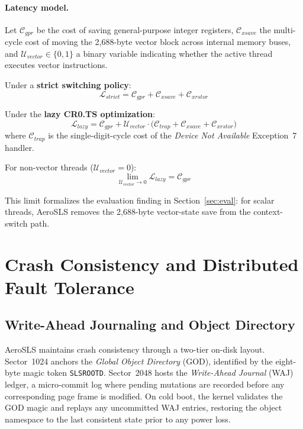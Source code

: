 \documentclass[sigconf]{acmart}
\begin{document}
\paragraph{Latency model.}
Let $\mathcal{C}_{gpr}$ be the cost of saving general-purpose
integer registers, $\mathcal{C}_{xsave}$ the multi-cycle cost of
moving the 2,688-byte vector block across internal memory buses,
and $\mathcal{U}_{vector} \in \{0,1\}$ a binary variable
indicating whether the active thread executes vector
instructions.

Under a \textbf{strict switching policy}:
\begin{equation}
\mathcal{L}_{strict} = \mathcal{C}_{gpr} +
  \mathcal{C}_{xsave} + \mathcal{C}_{xrstor}
\end{equation}

Under the \textbf{lazy CR0.TS optimization}:
\begin{equation}
\mathcal{L}_{lazy} = \mathcal{C}_{gpr} + \mathcal{U}_{vector}
  \cdot \bigl(\mathcal{C}_{trap} + \mathcal{C}_{xsave} +
  \mathcal{C}_{xrstor}\bigr)
\end{equation}
where $\mathcal{C}_{trap}$ is the single-digit-cycle cost of the
\emph{Device Not Available} Exception~7 handler.

For non-vector threads ($\mathcal{U}_{vector} = 0$):
\begin{equation}
\lim_{\mathcal{U}_{vector} \to 0} \mathcal{L}_{lazy}
  = \mathcal{C}_{gpr}
\end{equation}

This limit formalizes the evaluation finding in
Section~\ref{sec:eval}: for scalar threads,
AeroSLS removes the 2,688-byte vector-state save from the
context-switch path.

\section{Crash Consistency and Distributed Fault Tolerance}
\label{sec:consensus}

\subsection{Write-Ahead Journaling and Object Directory}
AeroSLS maintains crash consistency through a two-tier on-disk
layout.  Sector~1024 anchors the \emph{Global Object Directory}
(GOD), identified by the eight-byte magic token
\texttt{SLSROOTD}.  Sector~2048 hosts the \emph{Write-Ahead
Journal} (WAJ) ledger, a micro-commit log where pending
mutations are recorded before any corresponding page frame is
modified.  On cold boot, the kernel validates the GOD magic and
replays any uncommitted WAJ entries, restoring the object
namespace to the last consistent state prior to any power loss.
\end{document}
